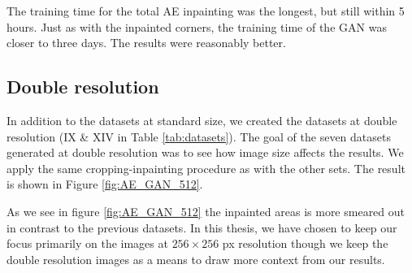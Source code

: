 \vspace{5px}
\noindent The training time for the total AE inpainting was the longest, but still within 5 hours.
Just as with the inpainted corners, the training time of the GAN was closer to three days. The results were reasonably better. 


\subsection{Double resolution}

In addition to the datasets at standard size, we created the datasets at double resolution (IX \& XIV in Table \ref{tab:datasets}).  The goal of the seven datasets generated at double resolution was to see how image size affects the results. We apply the same cropping-inpainting procedure as with the other sets. The result is shown in Figure \ref{fig:AE_GAN_512}.

As we see in figure \ref{fig:AE_GAN_512} the inpainted areas is more smeared out in contrast to the previous datasets. In this thesis, we have chosen to keep our focus primarily on the images at $256\times 256$ px resolution though we keep the double resolution images as a means to draw more context from our results.


